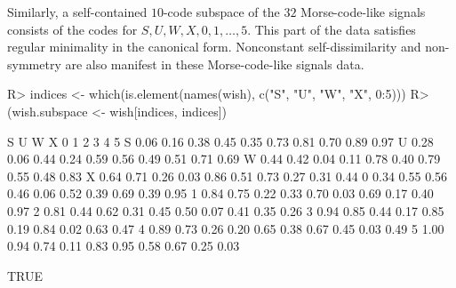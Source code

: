 \documentclass[nojss]{jss}
\begin{document}
Similarly, a self-contained $10$-code subspace of the $32$ Morse-code-like signals consists of the codes for 
$S, U, W, X, 0, 1, \ldots, 5$. This part of the  data satisfies regular minimality in the canonical form.
Nonconstant self-dissimilarity and non-symmetry are also manifest in these Morse-code-like signals data.
\begin{CodeChunk}
\begin{CodeInput}
R> indices <- which(is.element(names(wish), c("S", "U", "W", "X", 0:5)))
R> (wish.subspace <- wish[indices, indices])
\end{CodeInput}
\begin{CodeOutput}
     S    U    W    X    0    1    2    3    4    5
S 0.06 0.16 0.38 0.45 0.35 0.73 0.81 0.70 0.89 0.97
U 0.28 0.06 0.44 0.24 0.59 0.56 0.49 0.51 0.71 0.69
W 0.44 0.42 0.04 0.11 0.78 0.40 0.79 0.55 0.48 0.83
X 0.64 0.71 0.26 0.03 0.86 0.51 0.73 0.27 0.31 0.44
0 0.34 0.55 0.56 0.46 0.06 0.52 0.39 0.69 0.39 0.95
1 0.84 0.75 0.22 0.33 0.70 0.03 0.69 0.17 0.40 0.97
2 0.81 0.44 0.62 0.31 0.45 0.50 0.07 0.41 0.35 0.26
3 0.94 0.85 0.44 0.17 0.85 0.19 0.84 0.02 0.63 0.47
4 0.89 0.73 0.26 0.20 0.65 0.38 0.67 0.45 0.03 0.49
5 1.00 0.94 0.74 0.11 0.83 0.95 0.58 0.67 0.25 0.03
\end{CodeOutput}
\begin{CodeOutput}
[1] TRUE
\end{CodeOutput}
\end{CodeChunk}
 
\end{document}
